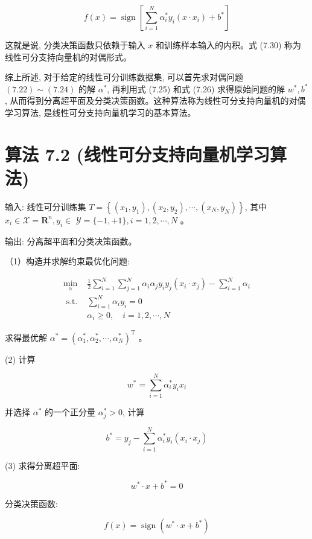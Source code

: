 \documentclass[10pt]{article}
\begin{document}
\begin{equation*}
f(x)=\operatorname{sign}\left[\sum_{i=1}^{N} \alpha_{i}^{*} y_{i}\left(x \cdot x_{i}\right)+b^{*}\right] \tag{7.30}
\end{equation*}


这就是说, 分类决策函数只依赖于输入 $x$ 和训练样本输入的内积。式 (7.30) 称为线性可分支持向量机的对偶形式。

综上所述, 对于给定的线性可分训练数据集, 可以首先求对偶问题 $(7.22) \sim(7.24)$ 的解 $\alpha^{*}$, 再利用式 (7.25) 和式 (7.26) 求得原始问题的解 $w^{*}, b^{*}$, 从而得到分离超平面及分类决策函数。这种算法称为线性可分支持向量机的对偶学习算法, 是线性可分支持向量机学习的基本算法。

\section*{算法 7.2 (线性可分支持向量机学习算法)}
输入: 线性可分训练集 $T=\left\{\left(x_{1}, y_{1}\right),\left(x_{2}, y_{2}\right), \cdots,\left(x_{N}, y_{N}\right)\right\}$, 其中 $x_{i} \in \mathcal{X}=\boldsymbol{R}^{n}, y_{i} \in$ $\mathcal{Y}=\{-1,+1\}, i=1,2, \cdots, N$ 。

输出: 分离超平面和分类决策函数。

（1）构造并求解约束最优化问题:

$$
\begin{array}{ll}
\min _{\alpha} & \frac{1}{2} \sum_{i=1}^{N} \sum_{j=1}^{N} \alpha_{i} \alpha_{j} y_{i} y_{j}\left(x_{i} \cdot x_{j}\right)-\sum_{i=1}^{N} \alpha_{i} \\
\text { s.t. } & \sum_{i=1}^{N} \alpha_{i} y_{i}=0 \\
& \alpha_{i} \geqslant 0, \quad i=1,2, \cdots, N
\end{array}
$$

求得最优解 $\alpha^{*}=\left(\alpha_{1}^{*}, \alpha_{2}^{*}, \cdots, \alpha_{N}^{*}\right)^{\mathrm{T}}$ 。

(2) 计算

$$
w^{*}=\sum_{i=1}^{N} \alpha_{i}^{*} y_{i} x_{i}
$$

并选择 $\alpha^{*}$ 的一个正分量 $\alpha_{j}^{*}>0$, 计算

$$
b^{*}=y_{j}-\sum_{i=1}^{N} \alpha_{i}^{*} y_{i}\left(x_{i} \cdot x_{j}\right)
$$

(3) 求得分离超平面:

$$
w^{*} \cdot x+b^{*}=0
$$

分类决策函数:

$$
f(x)=\operatorname{sign}\left(w^{*} \cdot x+b^{*}\right)
$$
\end{document}
